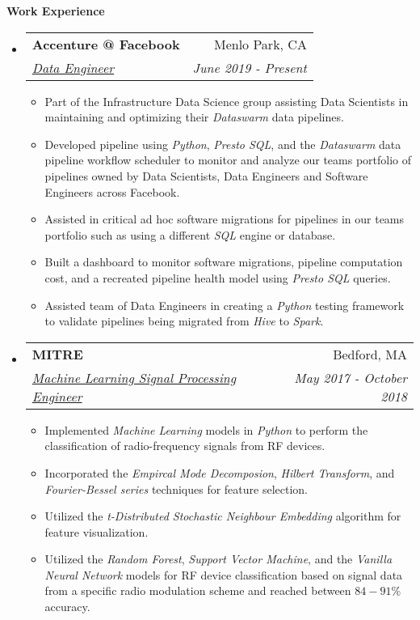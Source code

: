 \documentclass[letterpaper, 8pt]{extarticle}
\makeatletter
\newcommand{\resitem}[1]{\item #1 \vspace{-2pt}}
\newcommand{\resheading}[1]{{\large \colorbox{mygrey}{\begin{minipage}{0.99\textwidth}{\textbf{#1 \vphantom{p\^{E}}}}\end{minipage}}}}
\newcommand{\ressubheading}[4]{
\begin{tabular*}{7.40in}{l@{\extracolsep{\fill}}r}
		\textbf{#1} & #2 \\
		\textit{#3} & \textit{#4} \\
\end{tabular*}\vspace{-6pt}}
\makeatother
\begin{document}
\resheading{Work Experience}
\begin{itemize}
\setlength{\leftmargini}{0.5em}

\item
    \ressubheading{Accenture @ Facebook}{Menlo Park, CA}{\underline{Data Engineer}}{June 2019 - Present}
    \begin{itemize}
        \resitem{Part of the Infrastructure Data Science group assisting Data Scientists in maintaining and optimizing their \emph{Dataswarm} data pipelines.}
        \resitem{Developed pipeline using \emph{Python}, \emph{Presto SQL}, and the \emph{Dataswarm} data pipeline workflow scheduler to monitor and analyze our teams portfolio of pipelines owned by Data Scientists, Data Engineers and Software Engineers across Facebook.}
        \resitem{Assisted in critical ad hoc software migrations for pipelines in our teams portfolio such as using a different \emph{SQL} engine or database.}
        \resitem{Built a dashboard to monitor software migrations, pipeline computation cost, and a recreated pipeline health model using \emph{Presto SQL} queries.}
        \resitem{Assisted team of Data Engineers in creating a \emph{Python} testing framework to validate pipelines being migrated from \emph{Hive} to \emph{Spark}.}
    \end{itemize}

\item
	\ressubheading{MITRE}{Bedford, MA}{\underline{Machine Learning Signal Processing Engineer}}{May 2017 - October 2018}
	\begin{itemize}
	
	    \resitem{Implemented \emph{Machine Learning} models in \emph{Python} to perform the classification of radio-frequency signals from RF devices.}
	    
	    \resitem{Incorporated the \emph{Empircal Mode Decomposion}, \emph{Hilbert Transform}, and \emph{Fourier-Bessel series} techniques for feature selection.}
	    
	    \resitem{Utilized the  \emph{t-Distributed Stochastic Neighbour Embedding} algorithm for feature visualization.}
	    
	    \resitem{Utilized the \emph{Random Forest}, \emph{Support Vector Machine}, and the \emph{Vanilla Neural Network} models for RF device classification based on signal data from a specific radio modulation scheme and reached between $84 - 91 \% $ accuracy.}
	    

\end{itemize}
\end{itemize}
\end{document}
